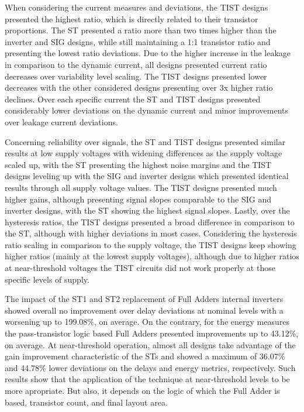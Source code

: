 \documentclass[diss,pgmicro,english]{iiufrgs}
\begin{document}
When considering the current measures and deviations, the TIST designs presented the highest ratio, which is directly related to their transistor proportions. The ST presented a ratio more than two times higher than the inverter and SIG designs, while still maintaining a 1:1 transistor ratio and presenting the lowest ratio deviations. Due to the higher increase in the leakage in comparison to the dynamic current, all designs presented current ratio decreases over variability level scaling. The TIST designs presented lower decreases with the other considered designs presenting over 3x higher ratio declines. Over each specific current the ST and TIST designs presented considerably lower deviations on the dynamic current and minor improvements over leakage current deviations.

Concerning reliability over signals, the ST and TIST designs presented similar results at low supply voltages with widening differences as the supply voltage scaled up, with the ST presenting the highest noise margins and the TIST designs leveling up with the SIG and inverter designs which presented identical results through all supply voltage values. The TIST designs presented much higher gains, although presenting signal slopes comparable to the SIG and inverter designs, with the ST showing the highest signal slopes. Lastly, over the hysteresis ratios, the TIST designs presented a broad difference in comparison to the ST, although with higher deviations in most cases. Considering the hysteresis ratio scaling in comparison to the supply voltage, the TIST designs keep showing higher ratios (mainly at the lowest supply voltages), although due to higher ratios at near-threshold voltages the TIST circuits did not work properly at those specific levels of supply.

The impact of the ST1 and ST2 replacement of Full Adders internal inverters showed overall no improvement over delay deviations at nominal levels with a worsening up to 199.08\%, on average. On the contrary, for the energy measures the pass-transistor logic based Full Adders presented improvements up to 43.12\%, on average. At near-threshold operation, almost all designs take advantage of the gain improvement characteristic of the STs and showed a maximum of 36.07\% and 44.78\% lower deviations on the delays and energy metrics, respectively. Such results show that the application of the technique at near-threshold levels to be more apropriate. But also, it depends on the logic of which the Full Adder is based, transistor count, and final layout area.
\end{document}
